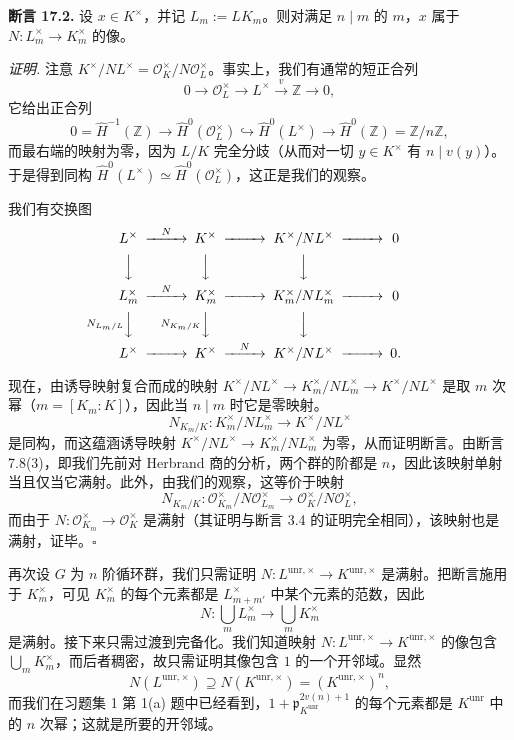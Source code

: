\textbf{断言 17.2.} 设 $x\in K^\times$，并记 $L_m:=LK_m$。则对满足 $n\mid m$ 的 $m$，$x$ 属于 $N:L_m^\times\to K_m^\times$ 的像。%

\textit{证明.} 注意 $K^\times/NL^\times=\mathcal O_K^\times/N\mathcal O_L^\times$。事实上，我们有通常的短正合列
\[
0\to \mathcal O_L^\times\to L^\times\xrightarrow{\ v\ }\mathbb Z\to 0,
\]
它给出正合列
\[
0=\widehat H^{-1}(\mathbb Z)\to \widehat H^0(\mathcal O_L^\times)\hookrightarrow \widehat H^0(L^\times)\to \widehat H^0(\mathbb Z)=\mathbb Z/n\mathbb Z,
\]
而最右端的映射为零，因为 $L/K$ 完全分歧（从而对一切 $y\in K^\times$ 有 $n\mid v(y)$）。于是得到同构 $\widehat H^0(L^\times)\simeq \widehat H^0(\mathcal O_L^\times)$，这正是我们的观察。

我们有交换图
\[
\begin{CD}
L^\times @>N>> K^\times @>>> K^\times/NL^\times @>>> 0\\
@VVV @VVV @VVV\\
L_m^\times @>N>> K_m^\times @>>> K_m^\times/NL_m^\times @>>> 0\\
@V{N_{L_m/L}}VV @V{N_{K_m/K}}VV @V{}VV\\
L^\times @>>> K^\times @>N>> K^\times/NL^\times @>>> 0.
\end{CD}
\]

现在，由诱导映射复合而成的映射 $K^\times/NL^\times\to K_m^\times/NL_m^\times\to K^\times/NL^\times$ 是取 $m$ 次幂（$m=[K_m:K]$），因此当 $n\mid m$ 时它是零映射。%
\[
N_{K_m/K}:K_m^\times/NL_m^\times\to K^\times/NL^\times
\]
是同构，而这蕴涵诱导映射 $K^\times/NL^\times\to K_m^\times/NL_m^\times$ 为零，从而证明断言。由断言 7.8(3)，即我们先前对 Herbrand 商的分析，两个群的阶都是 $n$，因此该映射单射当且仅当它满射。此外，由我们的观察，这等价于映射
\[
N_{K_m/K}:\mathcal O_{K_m}^\times/N\mathcal O_{L_m}^\times\to \mathcal O_K^\times/N\mathcal O_L^\times,
\]
而由于 $N:\mathcal O_{K_m}^\times\to \mathcal O_K^\times$ 是满射（其证明与断言 3.4 的证明完全相同），该映射也是满射，证毕。\hfill$\square$

再次设 $G$ 为 $n$ 阶循环群，我们只需证明 $N:L^{\mathrm{unr},\times}\to K^{\mathrm{unr},\times}$ 是满射。把断言施用于 $K_m^\times$，可见 $K_m^\times$ 的每个元素都是 $L_{m+m'}^\times$ 中某个元素的范数，因此
\[
N:\bigcup_m L_m^\times\to \bigcup_m K_m^\times
\]
是满射。接下来只需过渡到完备化。我们知道映射 $N:L^{\mathrm{unr},\times}\to K^{\mathrm{unr},\times}$ 的像包含 $\bigcup_m K_m^\times$，而后者稠密，故只需证明其像包含 $1$ 的一个开邻域。显然
\[
N(L^{\mathrm{unr},\times})\supseteq N(K^{\mathrm{unr},\times})=(K^{\mathrm{unr},\times})^n,
\]
而我们在习题集 1 第 1(a) 题中已经看到，$1+\mathfrak p_{K^{\mathrm{unr}}}^{2v(n)+1}$ 的每个元素都是 $K^{\mathrm{unr}}$ 中的 $n$ 次幂；这就是所要的开邻域。

